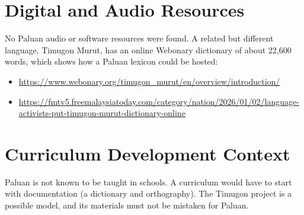 \documentclass[12pt]{article}
\begin{document}
\section{Digital and Audio Resources}
No Paluan audio or software resources were found. A related but different language, Timugon Murut, has an online Webonary dictionary of about 22,600 words, which shows how a Paluan lexicon could be hosted:
\begin{itemize}
\item \url{https://www.webonary.org/timugon_murut/en/overview/introduction/}
\item \url{https://fmtv5.freemalaysiatoday.com/category/nation/2026/01/02/language-activists-put-timugon-murut-dictionary-online}
\end{itemize}

\section{Curriculum Development Context}
Paluan is not known to be taught in schools. A curriculum would have to start with documentation (a dictionary and orthography). The Timugon project is a possible model, and its materials must not be mistaken for Paluan.
\end{document}
